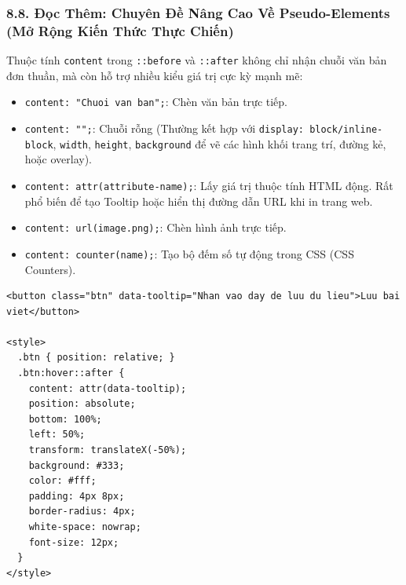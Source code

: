 \documentclass[11pt,oneside]{book}
\newcommand{\codeinline}[1]{\textcolor{accentOrange}{\texttt{#1}}}
\begin{document}
\subsubsection{8.8. Đọc Thêm: Chuyên Đề Nâng Cao Về Pseudo-Elements (Mở Rộng Kiến Thức Thực Chiến)}

\begin{conceptBox}
Thuộc tính \codeinline{content} trong \codeinline{::before} và \codeinline{::after} không chỉ nhận chuỗi văn bản đơn thuần, mà còn hỗ trợ nhiều kiểu giá trị cực kỳ mạnh mẽ:
\begin{itemize}[leftmargin=1.5em, itemsep=3pt, parsep=0pt]
    \item \codeinline{content: "Chuoi van ban";}: Chèn văn bản trực tiếp.
    \item \codeinline{content: "";}: Chuỗi rỗng (Thường kết hợp với \codeinline{display: block/inline-block}, \codeinline{width}, \codeinline{height}, \codeinline{background} để vẽ các hình khối trang trí, đường kẻ, hoặc overlay).
    \item \codeinline{content: attr(attribute-name);}: Lấy giá trị thuộc tính HTML động. Rất phổ biến để tạo Tooltip hoặc hiển thị đường dẫn URL khi in trang web.
    \item \codeinline{content: url(image.png);}: Chèn hình ảnh trực tiếp.
    \item \codeinline{content: counter(name);}: Tạo bộ đếm số tự động trong CSS (CSS Counters).
\end{itemize}
\end{conceptBox}

\begin{codeWindow}
\begin{lstlisting}[language=HTML5]
<button class="btn" data-tooltip="Nhan vao day de luu du lieu">Luu bai viet</button>

<style>
  .btn { position: relative; }
  .btn:hover::after {
    content: attr(data-tooltip);
    position: absolute;
    bottom: 100%;
    left: 50%;
    transform: translateX(-50%);
    background: #333;
    color: #fff;
    padding: 4px 8px;
    border-radius: 4px;
    white-space: nowrap;
    font-size: 12px;
  }
</style>
\end{lstlisting}
\end{codeWindow}
\end{document}
